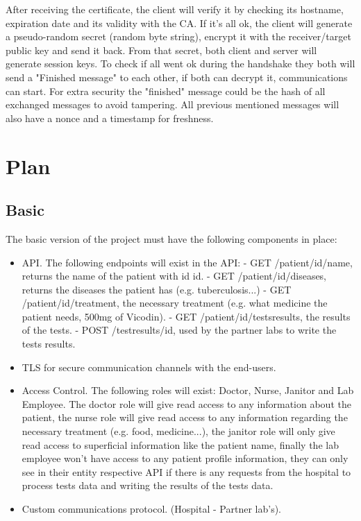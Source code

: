 After receiving the certificate, the client will verify it by checking its hostname, expiration date and its validity with the CA. If it's all ok, the client will generate a pseudo-random secret (random byte string), encrypt it with the receiver/target public key and send it back. From that secret, both client and server will generate session keys. To check if all went ok during the handshake they both will send a "Finished message" to each other, if both can decrypt it, communications can start. For extra security the "finished" message could be the hash of all exchanged messages to avoid tampering. All previous mentioned messages will also have a nonce and a timestamp for freshness. \\


\section{Plan}

\subsection{Basic}
The basic version of the project must have the following components in place:
\begin{itemize}
	\item API.
		\subitem The following endpoints will exist in the API:
		\subitem - GET /patient/{id}/name, returns the name of the patient with id {id}.
		\subitem - GET /patient/{id}/diseases, returns the diseases the patient has (e.g. tuberculosis...)
		\subitem - GET /patient/{id}/treatment, the necessary treatment (e.g. what medicine the patient needs, 500mg of Vicodin).
		\subitem - GET /patient/{id}/testsresults, the results of the tests.
		\subitem - POST /testresults/{id}, used by the partner labs to write the tests results.
	\item TLS for secure communication channels with the end-users.
	\item Access Control.
		\subitem The following roles will exist: Doctor, Nurse, Janitor and Lab Employee. The doctor role will give read access to any information about the patient, the nurse role will give read access to any information regarding the necessary treatment (e.g. food, medicine...), the janitor role will only give  read access to superficial information like the patient name, finally the lab employee won't have access to any patient profile information, they can only see in their entity respective API if there is any requests from the hospital to process tests data and writing the results of the tests data.
	\item Custom communications protocol. (Hospital - Partner lab's).
\end{itemize}

